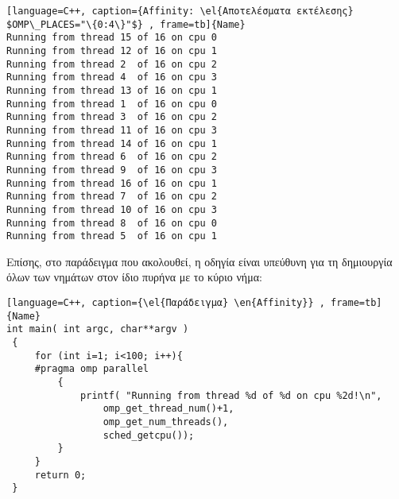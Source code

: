 \begin{spacing}{1.0}
\begin{lstlisting}[language=C++, caption={Affinity: \el{Αποτελέσματα εκτέλεσης} $OMP\_PLACES="\{0:4\}"$} , frame=tb]{Name}
Running from thread 15 of 16 on cpu 0
Running from thread 12 of 16 on cpu 1
Running from thread 2  of 16 on cpu 2
Running from thread 4  of 16 on cpu 3
Running from thread 13 of 16 on cpu 1
Running from thread 1  of 16 on cpu 0
Running from thread 3  of 16 on cpu 2
Running from thread 11 of 16 on cpu 3
Running from thread 14 of 16 on cpu 1
Running from thread 6  of 16 on cpu 2
Running from thread 9  of 16 on cpu 3
Running from thread 16 of 16 on cpu 1
Running from thread 7  of 16 on cpu 2
Running from thread 10 of 16 on cpu 3
Running from thread 8  of 16 on cpu 0
Running from thread 5  of 16 on cpu 1

\end{lstlisting}
\end{spacing}

Επίσης, στο παράδειγμα που ακολουθεί, η οδηγία  είναι υπεύθυνη για τη δημιουργία όλων των νημάτων στον ίδιο πυρήνα με το κύριο νήμα:

\begin{spacing}{1.0}
\begin{lstlisting}[language=C++, caption={\el{Παράδειγμα} \en{Affinity}} , frame=tb]{Name}
int main( int argc, char**argv )
 {
     for (int i=1; i<100; i++){
     #pragma omp parallel
         {
             printf( "Running from thread %d of %d on cpu %2d!\n",
                 omp_get_thread_num()+1,
                 omp_get_num_threads(),
                 sched_getcpu());
         }
     }
     return 0;
 }

\end{lstlisting}
\end{spacing}
\ \\

